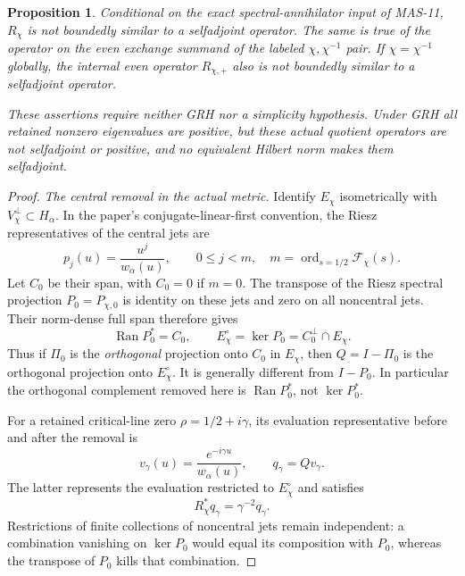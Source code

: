 \documentclass[11pt,a4paper]{article}
\newcommand{\fid}[1]{\textsf{#1}}
\newtheorem*{proposition}{Proposition}
\begin{document}
\begin{proposition}
Conditional on the exact spectral-annihilator input of \fid{MAS-11}, $R_\chi$ is not boundedly similar to a selfadjoint operator. The same is true of the operator on the even exchange summand of the labeled $\chi,\chi^{-1}$ pair. If $\chi=\chi^{-1}$ globally, the internal even operator $R_{\chi,+}$ also is not boundedly similar to a selfadjoint operator.

These assertions require neither GRH nor a simplicity hypothesis. Under GRH all retained nonzero eigenvalues are positive, but these actual quotient operators are not selfadjoint or positive, and no equivalent Hilbert norm makes them selfadjoint.
\end{proposition}
\begin{proof}
\emph{The central removal in the actual metric.}
Identify $E_\chi$ isometrically with $V_\chi^\perp\subset H_\alpha$. In the paper's conjugate-linear-first convention, the Riesz representatives of the central jets are
\[
 p_j(u)=\frac{u^j}{w_\alpha(u)},\qquad 0\le j<m,
 \quad m=\operatorname{ord}_{s=1/2}\mathcal F_\chi(s).
\]
Let $C_0$ be their span, with $C_0=0$ if $m=0$. The transpose of the Riesz spectral projection $P_0=P_{\chi,0}$ is identity on these jets and zero on all noncentral jets. Their norm-dense full span therefore gives
\[
 \operatorname{Ran}P_0^*=C_0,\qquad
 E_\chi^\circ=\ker P_0=C_0^\perp\cap E_\chi.
\]
Thus if $\Pi_0$ is the \emph{orthogonal} projection onto $C_0$ in $E_\chi$, then $Q=I-\Pi_0$ is the orthogonal projection onto $E_\chi^\circ$. It is generally different from $I-P_0$. In particular the orthogonal complement removed here is $\operatorname{Ran}P_0^*$, not $\ker P_0^*$.

For a retained critical-line zero $\rho=1/2+i\gamma$, its evaluation representative before and after the removal is
\[
 v_\gamma(u)=\frac{e^{-i\gamma u}}{w_\alpha(u)},\qquad
 q_\gamma=Qv_\gamma.
\]
The latter represents the evaluation restricted to $E_\chi^\circ$ and satisfies
\[
 R_\chi^*q_\gamma=\gamma^{-2}q_\gamma.
\]
Restrictions of finite collections of noncentral jets remain independent: a combination vanishing on $\ker P_0$ would equal its composition with $P_0$, whereas the transpose of $P_0$ kills that combination.


\end{proof}
\end{document}
